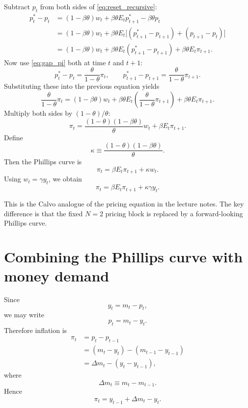 \documentclass[11pt]{article}
\begin{document}
Subtract $p_t$ from both sides of \eqref{eq:reset_recursive}:
\begin{align}
p_t^* - p_t
&= (1-\beta\theta)w_t + \beta\theta E_t p_{t+1}^* - \beta\theta p_t \\
&= (1-\beta\theta)w_t + \beta\theta E_t\bigl[(p_{t+1}^*-p_{t+1}) + (p_{t+1}-p_t)\bigr] \\
&= (1-\beta\theta)w_t + \beta\theta E_t(p_{t+1}^* - p_{t+1}) + \beta\theta E_t\pi_{t+1}.
\end{align}
Now use \eqref{eq:gap_pi} both at time $t$ and $t+1$:
\begin{equation}
p_t^* - p_t = \frac{\theta}{1-\theta}\pi_t,
\qquad
p_{t+1}^* - p_{t+1} = \frac{\theta}{1-\theta}\pi_{t+1}.
\end{equation}
Substituting these into the previous equation yields
\begin{equation}
\frac{\theta}{1-\theta}\pi_t
=
(1-\beta\theta)w_t
+
\beta\theta E_t\left(\frac{\theta}{1-\theta}\pi_{t+1}\right)
+
\beta\theta E_t\pi_{t+1}.
\end{equation}
Multiply both sides by $(1-\theta)/\theta$:
\begin{equation}
\pi_t
=
\frac{(1-\theta)(1-\beta\theta)}{\theta}w_t
+
\beta E_t\pi_{t+1}.
\end{equation}
Define
\begin{equation}
\kappa \equiv \frac{(1-\theta)(1-\beta\theta)}{\theta}.
\end{equation}
Then the Phillips curve is
\begin{equation}
\pi_t = \beta E_t\pi_{t+1} + \kappa w_t.
\label{eq:nkpc_w}
\end{equation}
Using $w_t=\gamma y_t$, we obtain
\begin{equation}
\boxed{\pi_t = \beta E_t\pi_{t+1} + \kappa\gamma y_t.}
\label{eq:nkpc_y}
\end{equation}

This is the Calvo analogue of the pricing equation in the lecture notes. The key difference is that
the fixed $N=2$ pricing block is replaced by a forward-looking Phillips curve.

\section{Combining the Phillips curve with money demand}

Since
\begin{equation}
y_t = m_t - p_t,
\end{equation}
we may write
\begin{equation}
p_t = m_t - y_t.
\end{equation}
Therefore inflation is
\begin{align}
\pi_t
&= p_t - p_{t-1} \\
&= (m_t - y_t) - (m_{t-1} - y_{t-1}) \\
&= \Delta m_t - (y_t - y_{t-1}),
\end{align}
where
\begin{equation}
\Delta m_t \equiv m_t - m_{t-1}.
\end{equation}
Hence
\begin{equation}
\boxed{\pi_t = y_{t-1} + \Delta m_t - y_t.}
\label{eq:pi_output}
\end{equation}
\end{document}
